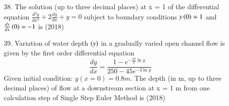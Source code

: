 \documentclass[journal]{IEEEtran}
\begin{document}
\begin{enumerate}
    \item[38.] The solution (up to three decimal places) at x = 1 of the differential equation $\frac{d^2y}{dx^2}+2\frac{dy}{dx}+y=0$ subject to boundary conditions $y\left(0\right)=1$ and $\frac{dy}{dx}\left(0\right) = -1$ is \hfill (2018)
    \item[39.] Variation of water depth $\left(y\right)$ in a gradually varied open channel flow is given by the first
    order differential equation $$\frac{dy}{dx} = \frac{1-e^{-\frac{10}{3}\ln y}}{250-45e^{-3\ln y}}$$Given initial condition: $y(x = 0) = 0.8 m$. The depth (in m, up to three decimal places) of
    flow at a downstream section at x = 1 m from one calculation step of Single Step Euler Method is \hfill (2018)
     
\end{enumerate}
\end{document}
